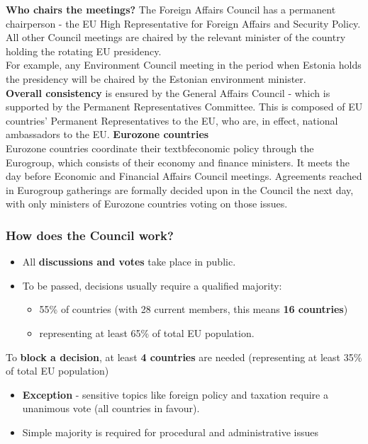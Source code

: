 \textbf{Who chairs the meetings?}
The Foreign Affairs Council has a permanent chairperson - the EU High Representative for Foreign Affairs and Security Policy. All other Council meetings are chaired by the relevant minister of the country holding the rotating EU presidency.
\\
For example, any Environment Council meeting in the period when Estonia holds the presidency will be chaired by the Estonian environment minister.
\\
\textbf{Overall consistency }is ensured by the General Affairs Council - which is supported by the Permanent Representatives Committee. This is composed of EU countries' Permanent Representatives to the EU, who are, in effect, national ambassadors to the EU.
\nextline
\textbf{Eurozone countries}
\\
Eurozone countries coordinate their textbf{economic policy} through the Eurogroup, which consists of their economy and finance ministers. It meets the day before Economic and Financial Affairs Council meetings. Agreements reached in Eurogroup gatherings are formally decided upon in the Council the next day, with only ministers of Eurozone countries voting on those issues.
\\

\subsubsection{How does the Council work?}
\begin{itemize}
	\item All \textbf{discussions and votes} take place in public.
	\item To be passed, decisions usually require a qualified majority:
	\begin{itemize}
		\item 55\% of countries (with 28 current members, this means \textbf{16 countries})
		\item representing at least 65\% of total EU population.
	\end{itemize}
\end{itemize}


To \textbf{block a decision}, at least \textbf{4 countries} are needed (representing at least 35\% of total EU population)
\begin{itemize}
\item \textbf{Exception} - sensitive topics like foreign policy and taxation require a unanimous vote (all countries in favour).
\item Simple majority is required for procedural and administrative issues
\end{itemize}

